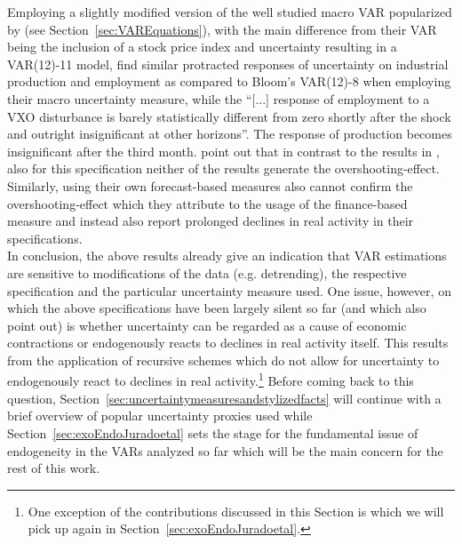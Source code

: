 \documentclass[a4paper,11pt,listof=nochaptergap,oneside,pointednumbers,bibtotoc,bigheadings,liststotoc,hidelinks]{scrbook}
\theoremstyle{mysatz}
\theoremstyle{mydefinition}
\theoremstyle{mytheorem}
\theoremstyle{mybemerkung}
\begin{document}
Employing a slightly modified version of the well studied macro VAR popularized by \citet{christianoetal:05} (see Section~\ref{sec:VAREquations}), with the main difference from their VAR being the inclusion of a stock price index and uncertainty resulting in a VAR(12)-11 model, \citet[p. 1204]{juradoetal:15} find similar protracted responses of uncertainty on industrial production and employment as compared to Bloom's VAR(12)-8 when employing their macro uncertainty measure, while the ``[...] response of employment to a VXO disturbance is barely statistically different from zero shortly after the shock and outright insignificant at other horizons''. The response of production becomes insignificant after the third month. \citet{juradoetal:15} point out that in contrast to the results in \citet{bloom:09}, also for this specification neither of the results generate the overshooting-effect. Similarly, \citet{bachmannetal:13} using their own forecast-based measures also cannot confirm the overshooting-effect which they attribute to the usage of the finance-based measure and instead also report prolonged declines in real activity in their specifications.\\


In conclusion, the above results already give an indication that VAR estimations are sensitive to modifications of the data  (e.g. detrending), the respective specification and the particular uncertainty measure used. One issue, however, on which the above specifications have been largely silent so far (and which also \citet{juradoetal:15} point out) is whether uncertainty can be regarded as a cause of economic contractions or endogenously reacts to declines in real activity itself. This results from the application of recursive schemes which do not allow for uncertainty to endogenously react to declines in real activity.\footnote{One exception of the contributions discussed in this Section is \citet{bachmannetal:13} which we will pick up again in Section~\ref{sec:exoEndoJuradoetal}.} Before coming back to this question, Section~\ref{sec:uncertaintymeasuresandstylizedfacts} will continue with a brief overview of popular uncertainty proxies used while Section~\ref{sec:exoEndoJuradoetal} sets the stage for the fundamental issue of endogeneity in the VARs analyzed so far which will be the main concern for the rest of this work.
\end{document}
